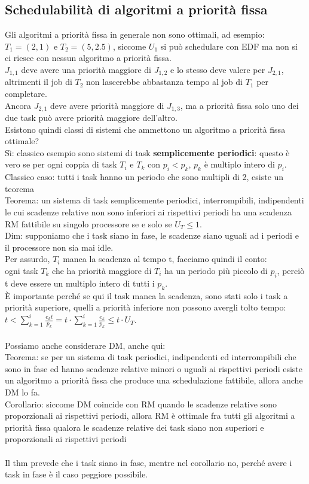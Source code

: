 \documentclass[12pt, oneside]{extbook}
\begin{document}
\subsection{Schedulabilità di algoritmi a priorità fissa}
Gli algoritmi a priorità fissa in generale non sono ottimali, ad esempio: $T_1 = (2,1)$ e $T_2 = (5, 2.5)$, siccome $U_1$ si può schedulare con EDF ma non si ci riesce con nessun algoritmo a priorità fissa.\\
$J_{1,1}$ deve avere una priorità maggiore di $J_{1,2}$ e lo stesso deve valere per $J_{2,1}$, altrimenti il job di $T_2$ non lascerebbe abbastanza tempo al job di $T_1$ per completare.\\
Ancora $J_{2,1}$ deve avere priorità maggiore di $J_{1,3}$, ma a priorità fissa solo uno dei due task può avere priorità maggiore dell'altro.\\
Esistono quindi classi di sistemi che ammettono un algoritmo a priorità fissa ottimale?\\Sì: classico esempio sono sistemi di task \textbf{semplicemente periodici}: questo è vero se per ogni coppia di task $T_i$ e $T_k$ con $p_i < p_k$, $p_k$ è multiplo intero di $p_i$.\\
Classico caso: tutti i task hanno un periodo che sono multipli di 2, esiste un teorema\\
Teorema: un sistema di task semplicemente periodici, interrompibili, indipendenti le cui scadenze relative non sono inferiori ai rispettivi periodi ha una scadenza RM fattibile su singolo processore se e solo se $U_T \leq 1$.\\
Dim: supponiamo che i task siano in fase, le scadenze siano uguali ad i periodi e il processore non sia mai idle.\\
Per assurdo, $T_i$ manca la scadenza al tempo t, facciamo quindi il conto:\\
ogni task $T_k$ che ha priorità maggiore di $T_i$ ha un periodo più piccolo di $p_i$, perciò t deve essere un multiplo intero di tutti i $p_k$.\\
È importante perché se qui il task manca la scadenza, sono stati solo i task a priorità superiore, quelli a priorità inferiore non possono avergli tolto tempo:\\
$t < \sum_{k = 1}^{i} \frac{e_k t}{p_k} = t \cdot \sum_{k = 1}^{i} \frac{e_k}{p_k} \leq t \cdot U_T$.\\\\
Possiamo anche considerare DM, anche qui:\\
Teorema: se per un sistema di task periodici, indipendenti ed interrompibili che sono in fase ed hanno scadenze relative minori o uguali ai rispettivi periodi esiste un algoritmo a priorità fissa che produce una schedulazione fattibile, allora anche DM lo fa.\\
Corollario: siccome DM coincide con RM quando le scadenze relative sono proporzionali ai rispettivi periodi, allora RM è ottimale fra tutti gli algoritmi a priorità fissa qualora le scadenze relative dei task siano non superiori e proporzionali ai rispettivi periodi\\\\
Il thm prevede che i task siano in fase, mentre nel corollario no, perché avere i task in fase è il caso peggiore possibile.
\end{document}
